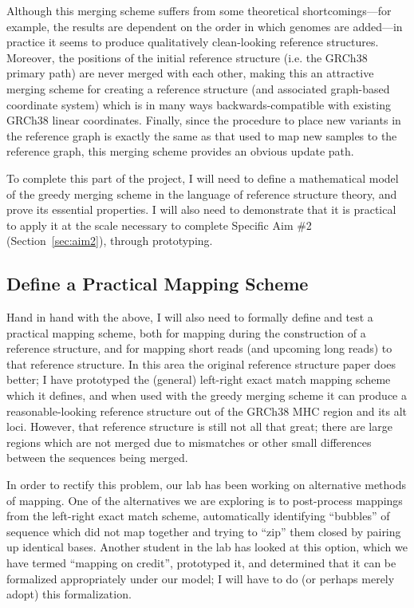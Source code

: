 \documentclass[11pt,proposal]{ucthesis}
\begin{document}
Although this merging scheme suffers from some theoretical shortcomings---for example, the results are dependent on the order in which genomes are added---in practice it seems to produce qualitatively clean-looking reference structures. Moreover, the positions of the initial reference structure (i.e. the GRCh38 primary path) are never merged with each other, making this an attractive merging scheme for creating a reference structure (and associated graph-based coordinate system) which is in many ways backwards-compatible with existing GRCh38 linear coordinates. Finally, since the procedure to place new variants in the reference graph is exactly the same as that used to map new samples to the reference graph, this merging scheme provides an obvious update path.

To complete this part of the project, I will need to define a mathematical model of the greedy merging scheme in the language of reference structure theory, and prove its essential properties. I will also need to demonstrate that it is practical to apply it at the scale necessary to complete Specific Aim \#2 (Section~\ref{sec:aim2}), through prototyping.

\subsection{Define a Practical Mapping Scheme}
\label{subsec:aim1mapping}

Hand in hand with the above, I will also need to formally define and test a practical mapping scheme, both for mapping during the construction of a reference structure, and for mapping short reads (and upcoming long reads) to that reference structure. In this area the original reference structure paper does better; I have prototyped the (general) left-right exact match mapping scheme which it defines, and when used with the greedy merging scheme it can produce a reasonable-looking reference structure out of the GRCh38 MHC region and its alt loci. However, that reference structure is still not all that great; there are large regions which are not merged due to mismatches or other small differences between the sequences being merged.

In order to rectify this problem, our lab has been working on alternative methods of mapping. One of the alternatives we are exploring is to post-process mappings from the left-right exact match scheme, automatically identifying ``bubbles'' of sequence which did not map together and trying to ``zip'' them closed by pairing up identical bases. Another student in the lab has looked at this option, which we have termed ``mapping on credit'', prototyped it, and determined that it can be formalized appropriately under our model; I will have to do (or perhaps merely adopt) this formalization.
\end{document}
